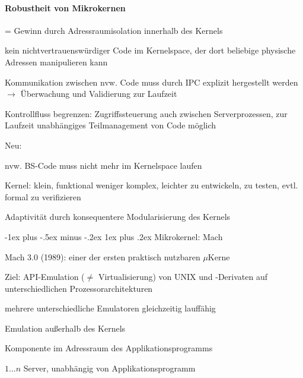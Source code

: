 \documentclass[a4paper]{article}
\makeatletter
\newcommand{\cmark}{\ding{51}}
\renewcommand{\subsubsection}{\@startsection{subsubsection}{3}{0mm}%
 {-1ex plus -.5ex minus -.2ex}%
 {1ex plus .2ex}%
 {\normalfont\small\bfseries}}
\makeatother
\begin{document}
\begin{multicols}{3}
    \paragraph{Robustheit von Mikrokernen}
    \begin{itemize*}
        \item[=] Gewinn durch Adressraumisolation innerhalb des Kernels
        \item[\cmark] kein nichtvertrauenswürdiger Code im Kernelspace, der dort beliebige physische Adressen manipulieren kann
        \item[\cmark] Kommunikation zwischen nvw. Code muss durch IPC explizit hergestellt werden $\rightarrow$ Überwachung und Validierung zur Laufzeit
        \item[\cmark] Kontrollfluss begrenzen: Zugriffssteuerung auch zwischen Serverprozessen, zur Laufzeit unabhängiges Teilmanagement von Code möglich %
        \item Neu:
        \item[\cmark] nvw. BS-Code muss nicht mehr im Kernelspace laufen
        \item[\cmark] Kernel: klein, funktional weniger komplex, leichter zu entwickeln, zu testen, evtl. formal zu verifizieren
        \item[\cmark] Adaptivität durch konsequentere Modularisierung des Kernels
    \end{itemize*}

    \subsubsection{Mikrokernel: Mach}
    \begin{itemize*}
        \item Mach 3.0 (1989): einer der ersten praktisch nutzbaren $\mu$Kerne
        \item Ziel: API-Emulation ($\not=$ Virtualisierung) von UNIX und -Derivaten auf unterschiedlichen Prozessorarchitekturen
        \item mehrere unterschiedliche Emulatoren gleichzeitig lauffähig
        \begin{itemize*}
            \item Emulation außerhalb des Kernels
            \item Komponente im Adressraum des Applikationsprogramms
            \item $1...n$ Server, unabhängig von Applikationsprogramm
        \end{itemize*}
    \end{itemize*}


\end{multicols}
\end{document}

